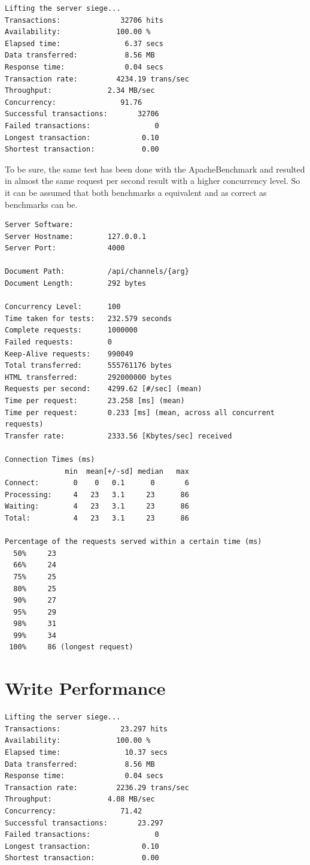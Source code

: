 \begin{lstlisting}
Lifting the server siege...
Transactions:		       32706 hits
Availability:		      100.00 %
Elapsed time:		        6.37 secs
Data transferred:	        8.56 MB
Response time:		        0.04 secs
Transaction rate:	      4234.19 trans/sec
Throughput:		        2.34 MB/sec
Concurrency:		       91.76
Successful transactions:       32706
Failed transactions:	           0
Longest transaction:	        0.10
Shortest transaction:	        0.00
\end{lstlisting}

To be sure, the same test has been done with the ApacheBenchmark and resulted in almost the same request per second result with a higher concurrency level. So it can be assumed that both benchmarks a equivalent and as correct as benchmarks can be. 

\begin{lstlisting}
Server Software:        
Server Hostname:        127.0.0.1
Server Port:            4000

Document Path:          /api/channels/{arg}
Document Length:        292 bytes

Concurrency Level:      100
Time taken for tests:   232.579 seconds
Complete requests:      1000000
Failed requests:        0
Keep-Alive requests:    990049
Total transferred:      555761176 bytes
HTML transferred:       292000000 bytes
Requests per second:    4299.62 [#/sec] (mean)
Time per request:       23.258 [ms] (mean)
Time per request:       0.233 [ms] (mean, across all concurrent requests)
Transfer rate:          2333.56 [Kbytes/sec] received

Connection Times (ms)
              min  mean[+/-sd] median   max
Connect:        0    0   0.1      0       6
Processing:     4   23   3.1     23      86
Waiting:        4   23   3.1     23      86
Total:          4   23   3.1     23      86

Percentage of the requests served within a certain time (ms)
  50%     23
  66%     24
  75%     25
  80%     25
  90%     27
  95%     29
  98%     31
  99%     34
 100%     86 (longest request)
\end{lstlisting}

\section{Write Performance}
\begin{lstlisting}
Lifting the server siege...
Transactions:		       23.297 hits
Availability:		      100.00 %
Elapsed time:		        10.37 secs
Data transferred:	        8.56 MB
Response time:		        0.04 secs
Transaction rate:	      2236.29 trans/sec
Throughput:		        4.08 MB/sec
Concurrency:		       71.42
Successful transactions:       23.297
Failed transactions:	           0
Longest transaction:	        0.10
Shortest transaction:	        0.00
\end{lstlisting}
